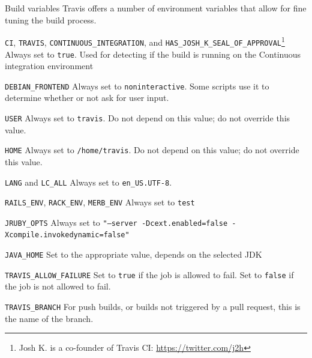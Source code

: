 \documentclass[presentation]{beamer}
\begin{document}
\begin{frame}[allowframebreaks]{Build variables}
    Travis offers a number of environment variables that allow for fine tuning the build process.
    \begin{block}{\texttt{CI}, \texttt{TRAVIS}, \texttt{CONTINUOUS\_INTEGRATION}, and \texttt{HAS\_JOSH\_K\_SEAL\_OF\_APPROVAL}\footnote{Josh K. is a co-founder of Travis CI: \url{https://twitter.com/j2h}}}
        Always set to \texttt{true}. Used for detecting if the build is running on the Continuous integration environment
    \end{block}
    \begin{block}{\texttt{DEBIAN\_FRONTEND}}
        Always set to \texttt{noninteractive}. Some scripts use it to determine whether or not ask for user input.
    \end{block}
    \begin{block}{\texttt{USER}}
        Always set to \texttt{travis}. Do not depend on this value; do not override this value.
    \end{block}
    \begin{block}{\texttt{HOME}}
        Always set to \texttt{/home/travis}. Do not depend on this value; do not override this value.
    \end{block}
    \begin{block}{\texttt{LANG} and \texttt{LC\_ALL}}
        Always set to \texttt{en\_US.UTF-8}.
    \end{block}
    \begin{block}{\texttt{RAILS\_ENV}, \texttt{RACK\_ENV}, \texttt{MERB\_ENV}}
        Always set to \texttt{test}
    \end{block}
    \begin{block}{\texttt{JRUBY\_OPTS}}
         Always set to \texttt{"--server -Dcext.enabled=false -Xcompile.invokedynamic=false"}
    \end{block}
    \begin{block}{\texttt{JAVA\_HOME}}
        Set to the appropriate value, depends on the selected JDK
    \end{block}
    \begin{block}{\texttt{TRAVIS\_ALLOW\_FAILURE}}
        Set to \texttt{true} if the job is allowed to fail.
        Set to \texttt{false} if the job is not allowed to fail.
    \end{block}
    \begin{block}{\texttt{TRAVIS\_BRANCH}}
        For push builds, or builds not triggered by a pull request, this is the name of the branch.

\end{block}
\end{frame}
\end{document}
